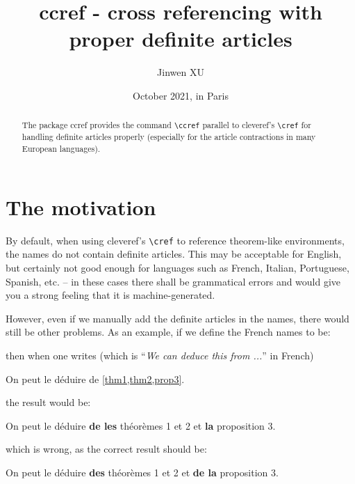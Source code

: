 \documentclass[classical]{einfart}
\newenvironment{demo}{%
    \LocallyStopLineNumbers%
    \begin{tcolorbox}[enhanced jigsaw,pad at break*=1mm,breakable,
        left=4mm,right=4mm,top=0.5mm,bottom=0mm,
        colback=gray!5!paper,boxrule=0pt,frame hidden,
        borderline west={1.5mm}{0mm}{gray!55!paper},arc=.7mm]%
}{\end{tcolorbox}\ResumeLineNumbers}
\newcommand{\ccrefpackage}{\textsf{ccref}}
\begin{document}
\title{\ccrefpackage{} - cross referencing with proper definite articles}
\author{Jinwen XU}
\date{October 2021, in Paris}

\maketitle

\begin{abstract}
    \raggedleft
    The package \ccrefpackage{} provides the command \lstinline|\ccref| parallel to \textsf{cleveref}'s \lstinline|\cref| for handling definite articles properly (especially for the article contractions in many European languages).
\end{abstract}

\section{The motivation}

By default, when using \textsf{cleveref}'s \lstinline|\cref| to reference theorem-like environments, the names do not contain definite articles. This may be acceptable for English, but certainly not good enough for languages such as French, Italian, Portuguese, Spanish, etc. -- in these cases there shall be grammatical errors and would give you a strong feeling that it is machine-generated.

However, even if we manually add the definite articles in the names, there would still be other problems. As an example, if we define the French names to be:

\begin{code}
\end{code}

then when one writes (which is ``\emph{We can deduce this from ...}'' in French)

\begin{code}
On peut le déduire de \cref{thm1,thm2,prop3}.
\end{code}

the result would be:

\begin{demo}
    On peut le déduire \textbf{de les} théorèmes 1 et 2 et \textbf{la} proposition 3.
\end{demo}

which is wrong, as the correct result should be:

\begin{demo}
    On peut le déduire \textbf{des} théorèmes 1 et 2 et \textbf{de la} proposition 3.
\end{demo}
\end{document}
